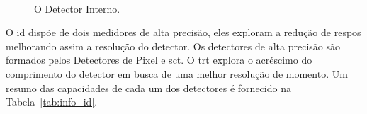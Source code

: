 \begin{figure}[h!t]
    \label{fig:det_interno}
    \begin{center}
%
        \\
    \end{center}
    \caption[O Detector Interno (ID)]{O Detector Interno.}%
\end{figure}

O \gls{id} dispõe de dois medidores de alta precisão, eles exploram a redução 
de \gls{respos} melhorando assim a resolução do detector. Os detectores de alta 
precisão são formados pelos Detectores de Pixel e \gls{sct}. O \gls{trt}
explora o acréscimo do \gls{comprimento} do detector em busca de uma melhor
resolução de momento. Um resumo das capacidades de
cada um dos detectores é fornecido na Tabela~\ref{tab:info_id}.

